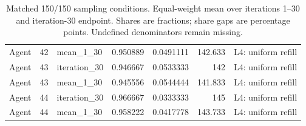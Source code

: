 \begin{table}[htbp!]
\begin{tabular}{lrlrrrl}
Agent & 42 & mean\_1\_30 & 0.950889 & 0.0491111 & 142.633 & L4: uniform refill \\
Agent & 43 & iteration\_30 & 0.946667 & 0.0533333 & 142 & L4: uniform refill \\
Agent & 43 & mean\_1\_30 & 0.945556 & 0.0544444 & 141.833 & L4: uniform refill \\
Agent & 44 & iteration\_30 & 0.966667 & 0.0333333 & 145 & L4: uniform refill \\
Agent & 44 & mean\_1\_30 & 0.958222 & 0.0417778 & 143.733 & L4: uniform refill \\
\hline
\end{tabular}
\caption{Matched 150/150 sampling conditions. Equal-weight mean over iterations 1--30 and iteration-30 endpoint. Shares are fractions; share gaps are percentage points. Undefined denominators remain missing.}
\label{chap:results:tab:rq1_sampling_click_behaviour}
\end{table}
